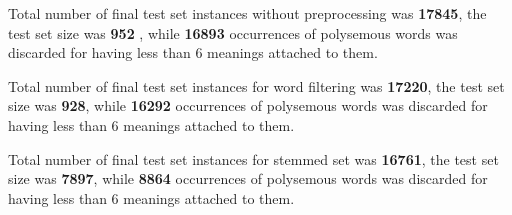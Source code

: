 Total number of final test set instances without preprocessing was  \textbf{17845}, the test set size was \textbf{952} , while \textbf{16893} occurrences of polysemous words was discarded for having less than 6 meanings attached to them.

Total number of final test set instances for word filtering was  \textbf{17220}, the test set size was \textbf{928}, while \textbf{16292} occurrences of polysemous words was discarded for having less than 6 meanings attached to them.

Total number of final test set instances for stemmed set was  \textbf{16761}, the test set size was \textbf{7897}, while \textbf{8864} occurrences of polysemous words was discarded for having less than 6 meanings attached to them.